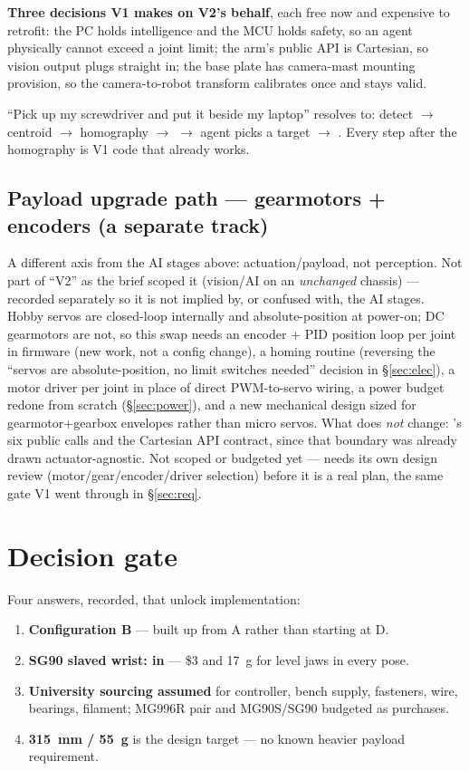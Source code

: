 \documentclass[11pt]{article}
\newcommand{\code}[1]{\texttt{\detokenize{#1}}}
\begin{document}
\textbf{Three decisions V1 makes on V2's behalf}, each free now and expensive to retrofit: the PC holds intelligence and the MCU holds safety, so an agent physically cannot exceed a joint limit; the arm's public API is Cartesian, so vision output plugs straight in; the base plate has camera-mast mounting provision, so the camera-to-robot transform calibrates once and stays valid.

``Pick up my screwdriver and put it beside my laptop'' resolves to: detect $\to$ centroid $\to$ homography $\to$ \code{arm.pickup(x,y,z)} $\to$ agent picks a target $\to$ \code{arm.place(x',y',z')}. Every step after the homography is V1 code that already works.

\subsection{Payload upgrade path --- gearmotors + encoders (a separate track)}
A different axis from the AI stages above: actuation/payload, not perception. Not part of ``V2'' as the brief scoped it (vision/AI on an \emph{unchanged} chassis) --- recorded separately so it is not implied by, or confused with, the AI stages. Hobby servos are closed-loop internally and absolute-position at power-on; DC gearmotors are not, so this swap needs an encoder + PID position loop per joint in firmware (new work, not a config change), a homing routine (reversing the ``servos are absolute-position, no limit switches needed'' decision in \S\ref{sec:elec}), a motor driver per joint in place of direct PWM-to-servo wiring, a power budget redone from scratch (\S\ref{sec:power}), and a new mechanical design sized for gearmotor+gearbox envelopes rather than micro servos. What does \emph{not} change: \code{robot.arm.Arm}'s six public calls and the Cartesian API contract, since that boundary was already drawn actuator-agnostic. Not scoped or budgeted yet --- needs its own design review (motor/gear/encoder/driver selection) before it is a real plan, the same gate V1 went through in \S\ref{sec:req}.

\section{Decision gate}

Four answers, recorded, that unlock implementation:

\begin{enumerate}
\item \textbf{Configuration B} --- built up from A rather than starting at D.
\item \textbf{SG90 slaved wrist: in} --- \$3 and 17~g for level jaws in every pose.
\item \textbf{University sourcing assumed} for controller, bench supply, fasteners, wire, bearings, filament; MG996R pair and MG90S/SG90 budgeted as purchases.
\item \textbf{315~mm / 55~g} is the design target --- no known heavier payload requirement.
\end{enumerate}
\end{document}
